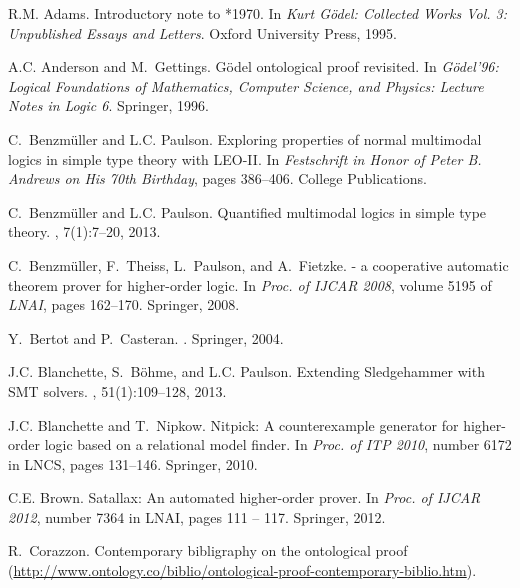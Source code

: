 \documentclass{llncs}
\begin{document}

%
\begin{thebibliography}{10}

R.M. Adams.
\newblock Introductory note to *1970.
\newblock In {\em {Kurt G\"odel: Collected Works Vol. 3: Unpublished Essays and
  Letters}}. Oxford University Press, 1995.

A.C. Anderson and M.~Gettings.
\newblock G\"odel ontological proof revisited.
\newblock In {\em {G\"odel'96: Logical Foundations of Mathematics, Computer
  Science, and Physics: Lecture Notes in Logic 6}}. {Springer}, 1996.

C.~Benzm{\"u}ller and L.C. Paulson.
\newblock Exploring properties of normal multimodal logics in simple type
  theory with {LEO-II}.
\newblock In {\em {Festschrift in Honor of {Peter B. Andrews} on His 70th
  Birthday}}, pages 386--406. College Publications.

C.~Benzm{\"u}ller and L.C. Paulson.
\newblock Quantified multimodal logics in simple type theory.
,
  7(1):7--20, 2013.

C.~Benzm{\"u}ller, F.~Theiss, L.~Paulson, and A.~Fietzke.
 - a cooperative automatic theorem prover for higher-order
  logic.
\newblock In {\em Proc. of IJCAR 2008}, volume 5195 of {\em LNAI}, pages
  162--170. Springer, 2008.

Y.~Bertot and P.~Casteran.
.
\newblock Springer, 2004.

J.C. Blanchette, S.~B\"ohme, and L.C. Paulson.
\newblock Extending {Sledgehammer} with {SMT} solvers.
, 51(1):109--128, 2013.

J.C. Blanchette and T.~Nipkow.
\newblock Nitpick: A counterexample generator for higher-order logic based on a
  relational model finder.
\newblock In {\em Proc. of ITP 2010}, number 6172 in LNCS, pages 131--146.
  Springer, 2010.

C.E. Brown.
\newblock Satallax: An automated higher-order prover.
\newblock In {\em Proc. of IJCAR 2012}, number 7364 in LNAI, pages 111 -- 117.
  Springer, 2012.

R.~Corazzon.
\newblock Contemporary bibligraphy on the ontological proof
  (\url{http://www.ontology.co/biblio/ontological-proof-contemporary-biblio.htm}).


\end{thebibliography}
\end{document}
